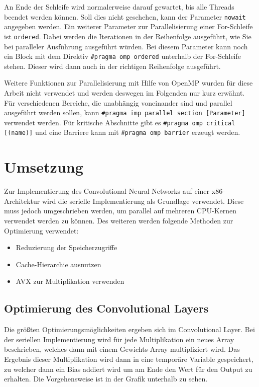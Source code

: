 \documentclass[../main.tex]{subfiles}
\begin{document}
An Ende der Schleife wird normalerweise darauf gewartet, bis alle Threads beendet werden können. Soll dies nicht geschehen, kann der Parameter \texttt{nowait} angegeben werden.
Ein weiterer Parameter zur Parallelisierung einer For-Schleife ist \texttt{ordered}. Dabei werden die Iterationen in der Reihenfolge ausgeführt, wie Sie bei paralleler Ausführung ausgeführt würden. Bei diesem Parameter kann noch ein Block mit dem Direktiv \texttt{\#pragma omp ordered} unterhalb der For-Schleife stehen. Dieser wird dann auch in der richtigen Reihenfolge ausgeführt.

Weitere Funktionen zur Parallelisierung mit Hilfe von OpenMP wurden für diese Arbeit nicht verwendet und werden deswegen im Folgenden nur kurz erwähnt.
Für verschiedenen Bereiche, die unabhängig voneinander sind und parallel ausgeführt werden sollen, kann \texttt{\#pragma imp parallel section [Parameter]} verwendet werden.
Für kritische Abschnitte gibt es \texttt{\#pragma omp critical [(name)]} und eine Barriere kann mit \texttt{\#pragma omp barrier} erzeugt werden.

\section{Umsetzung}

Zur Implementierung des Convolutional Neural Networks auf einer x86-Architektur wird die serielle Implementierung als Grundlage verwendet. Diese muss jedoch umgeschrieben werden, um parallel auf mehreren CPU-Kernen verwendet werden zu können. Des weiteren werden folgende Methoden zur Optimierung verwendet:
\begin{itemize}
	\item Reduzierung der Speicherzugriffe
	\item Cache-Hierarchie ausnutzen
	\item AVX zur Multiplikation verwenden
\end{itemize}

\subsection{Optimierung des Convolutional Layers}

Die größten Optimierungsmöglichkeiten ergeben sich im Convolutional Layer. Bei der seriellen Implementierung wird für jede Multiplikation ein neues Array beschrieben, welches dann mit einem Gewichts-Array multipliziert wird. Das Ergebnis dieser Multiplikation wird dann in eine temporäre Variable gespeichert, zu welcher dann ein Bias addiert wird um am Ende den Wert für den Output zu erhalten. Die Vorgehensweise ist in der Grafik unterhalb zu sehen.
\end{document}
